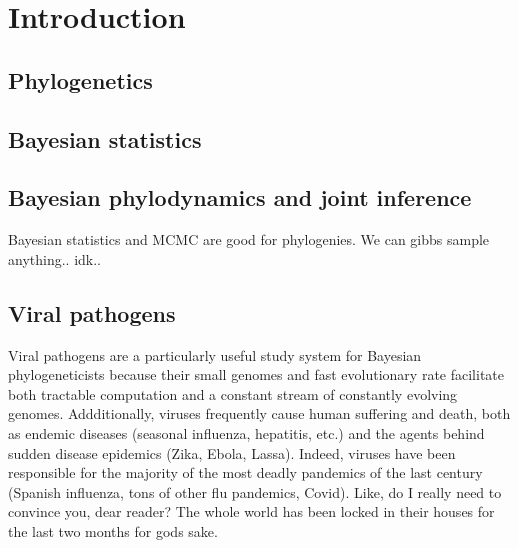 \chapter{Introduction}\label{ch:introduction}



\section{Phylogenetics}

\cite{FrRo2010Diffusion}

\section{Bayesian statistics}

\section{Bayesian phylodynamics and joint inference}

Bayesian statistics and MCMC are good for phylogenies.
We can gibbs sample anything.. idk..


\section{Viral pathogens}

Viral pathogens are a particularly useful study system for Bayesian phylogeneticists because their small genomes and fast evolutionary rate facilitate both tractable computation and a constant stream of constantly evolving genomes.
Addditionally, viruses frequently cause human suffering and death, both as endemic diseases (seasonal influenza, hepatitis, etc.) and the agents behind sudden disease epidemics (Zika, Ebola, Lassa).
Indeed, viruses have been responsible for the majority of the most deadly pandemics of the last century (Spanish influenza, tons of other flu pandemics, Covid).
Like, do I really need to convince you, dear reader?
The whole world has been locked in their houses for the last two months for gods sake.


